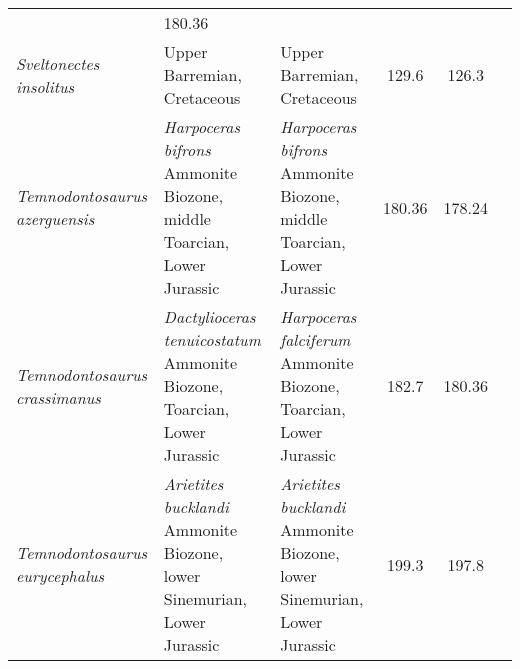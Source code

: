 \begin{longtabu}{>{\itshape}lXXSSl}
                                                                      & 180.36
                                                                      &
                                                                      \cite{vonHuene1922,Maisch1998NJGPAd} \\          
	Sveltonectes insolitus                               & Upper Barremian,
        Cretaceous
                                                             & Upper Barremian,
        Cretaceous
                                                             & 129.6
                                                             & 126.3
                                                             &
                                                             \cite{Fischer2011JVP} \\                   
	Temnodontosaurus azerguensis                         & \emph{Harpoceras
        bifrons} Ammonite Biozone, middle Toarcian, Lower Jurassic
                                                             & \emph{Harpoceras
        bifrons} Ammonite Biozone, middle Toarcian, Lower Jurassic
                                                             & 180.36
                                                             & 178.24
                                                             & \cite{Martin2012P} \\                     
	Temnodontosaurus crassimanus                         &
        \emph{Dactylioceras tenuicostatum} Ammonite Biozone, Toarcian, Lower
        Jurassic                                                      &
        \emph{Harpoceras falciferum} Ammonite Biozone, Toarcian, Lower Jurassic
                                                                      & 182.7
                                                                      & 180.36
                                                                      &
                                                                      \cite{Melmore1930AMNH} \\                    
	Temnodontosaurus eurycephalus                        & \emph{Arietites
        bucklandi} Ammonite Biozone, lower Sinemurian, Lower Jurassic
                                                             & \emph{Arietites
        bucklandi} Ammonite Biozone, lower Sinemurian, Lower Jurassic
                                                             & 199.3
                                                             & 197.8
                                                             &
                                                             \cite{McGowan1974LSCROM} \\                    

\end{longtabu}
